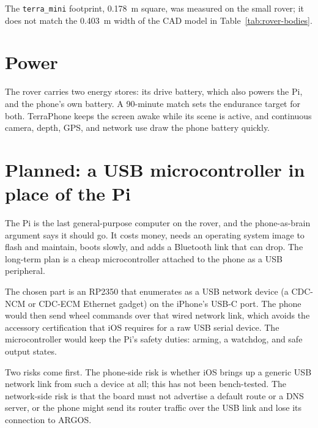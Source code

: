 The \texttt{terra\_mini} footprint, 0.178~m square, was measured on the small rover; it does not match the 0.403~m width of the CAD model in Table~\ref{tab:rover-bodies}.

\section{Power}
\label{sec:rover-power}

The rover carries two energy stores: its drive battery, which also powers the Pi, and the phone's own battery.
A 90-minute match sets the endurance target for both.
TerraPhone keeps the screen awake while its scene is active, and continuous camera, depth, GPS, and network use draw the phone battery quickly.

\section{Planned: a USB microcontroller in place of the Pi}
\label{sec:rover-rp2350}

The Pi is the last general-purpose computer on the rover, and the phone-as-brain argument says it should go.
It costs money, needs an operating system image to flash and maintain, boots slowly, and adds a Bluetooth link that can drop.
The long-term plan is a cheap microcontroller attached to the phone as a USB peripheral.

The chosen part is an RP2350 that enumerates as a USB network device (a CDC-NCM or CDC-ECM Ethernet gadget) on the iPhone's USB-C port.
The phone would then send wheel commands over that wired network link, which avoids the accessory certification that iOS requires for a raw USB serial device.
The microcontroller would keep the Pi's safety duties: arming, a watchdog, and safe output states.

Two risks come first.
The phone-side risk is whether iOS brings up a generic USB network link from such a device at all; this has not been bench-tested.
The network-side risk is that the board must not advertise a default route or a DNS server, or the phone might send its router traffic over the USB link and lose its connection to ARGOS.


